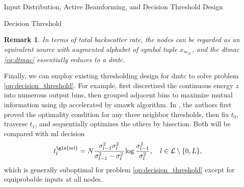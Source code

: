 \documentclass[journal]{IEEEtran}
\newtheorem{remark}{Remark}
\begin{document}
\begin{section}{Input Distribution, Active Beamforming, and Decision Threshold Design}
\begin{subsection}{Decision Threshold}
		\begin{remark}
			In terms of total backscatter rate, the nodes can be regarded as an equivalent source with augmented alphabet of symbol tuple $x_{m_{\mathcal{K}}}$, and the \gls{dtmac} \eqref{eq:dtmac} essentially reduces to a \gls{dmtc}.
		\end{remark}

		Finally, we can employ existing thresholding design for \gls{dmtc} to solve problem \eqref{op:decision_threshold}.
		For example, \cite{He2021} first discretized the continuous energy $z$ into numerous output bins, then grouped adjacent bins to maximize mutual information using \gls{dp} accelerated by \gls{smawk} algorithm.
		In \cite{Nguyen2020a}, the authors first proved the optimality condition for any three neighbor thresholds, then fix $t_0$, traverse $t_1$, and sequentially optimizes the others by bisection.
		Both will be compared with \gls{ml} decision \cite{Qian2019}
		\begin{equation}
			t_{l}^{\mathrm{\gls{ml}}} = N \frac{\sigma_{l-1}^2 \sigma_{l}^2}{\sigma_{l-1}^2 - \sigma_{l}^2} \log \frac{\sigma_{l-1}^2}{\sigma_{l}^2}, \quad l \in \mathcal{L} \setminus \{0,L\},
			\label{eq:detection_threshold_maximum_likelihood}
		\end{equation}
		which is generally suboptimal for problem \eqref{op:decision_threshold} except for equiprobable inputs at all nodes.



\end{subsection}
\end{section}
\end{document}
